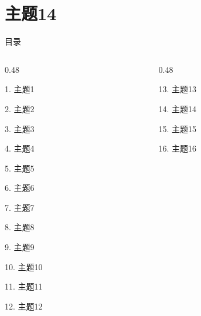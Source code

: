 \documentclass[aspectratio=169,10pt,fontset=fandol]{ctexbeamer}
\begin{document}
\section{主题14}
\begin{frame}[t,fragile]{目录}
\small
\begin{columns}[T,onlytextwidth]
\begin{column}{0.48\textwidth}
{\color{black}\small 1. 主题1\par}\vspace{0.22em}
{\color{black}\small 2. 主题2\par}\vspace{0.22em}
{\color{black}\small 3. 主题3\par}\vspace{0.22em}
{\color{black}\small 4. 主题4\par}\vspace{0.22em}
{\color{black}\small 5. 主题5\par}\vspace{0.22em}
{\color{black}\small 6. 主题6\par}\vspace{0.22em}
{\color{black}\small 7. 主题7\par}\vspace{0.22em}
{\color{black}\small 8. 主题8\par}\vspace{0.22em}
{\color{black}\small 9. 主题9\par}\vspace{0.22em}
{\color{black}\small 10. 主题10\par}\vspace{0.22em}
{\color{black}\small 11. 主题11\par}\vspace{0.22em}
{\color{black}\small 12. 主题12\par}\vspace{0.22em}
\end{column}
\begin{column}{0.48\textwidth}
{\color{black}\small 13. 主题13\par}\vspace{0.22em}
{\color{blue}\small 14. 主题14\par}\vspace{0.22em}
{\color{gray!40}\small 15. 主题15\par}\vspace{0.22em}
{\color{gray!40}\small 16. 主题16\par}\vspace{0.22em}

\end{column}
\end{columns}
\end{frame}
\end{document}

